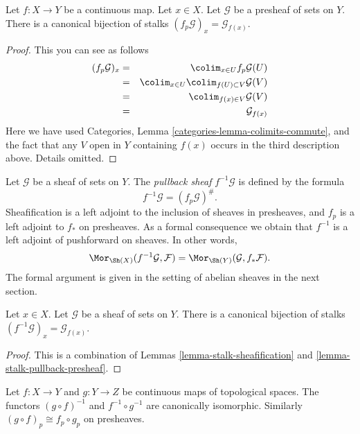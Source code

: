 \begin{lemma}
\label{lemma-stalk-pullback-presheaf}
Let $f : X \to Y$ be a continuous map.
Let $x \in X$. Let $\mathcal{G}$ be a presheaf of sets on $Y$.
There is a canonical bijection of stalks
$(f_p\mathcal{G})_x = \mathcal{G}_{f(x)}$.
\end{lemma}

\begin{proof}
This you can see as follows
\begin{eqnarray*}
(f_p\mathcal{G})_x
& = &
\colim_{x \in U} f_p\mathcal{G}(U) \\
& = &
\colim_{x \in U} \colim_{f(U) \subset V} \mathcal{G}(V) \\
& = &
\colim_{f(x) \in V} \mathcal{G}(V) \\
& = &
\mathcal{G}_{f(x)}
\end{eqnarray*}
Here we have used
Categories, Lemma \ref{categories-lemma-colimits-commute},
and the fact that any $V$ open in $Y$ containing $f(x)$
occurs in the third description above. Details omitted.
\end{proof}

\noindent
Let $\mathcal{G}$ be a sheaf of sets on $Y$.
The {\it pullback sheaf} $f^{-1}\mathcal{G}$ is defined
by the formula
$$
f^{-1}\mathcal{G} = (f_p\mathcal{G})^\# .
$$
Sheafification is a left adjoint to the inclusion
of sheaves in presheaves, and $f_p$ is a left
adjoint to $f_*$ on presheaves. As a formal consequence
we obtain that $f^{-1}$ is a left adjoint of
pushforward on sheaves. In other words,
$$
\Mor_{\Sh(X)}(f^{-1}\mathcal{G}, \mathcal{F})
=
\Mor_{\Sh(Y)}(\mathcal{G}, f_*\mathcal{F}).
$$
The formal argument is given in the setting of abelian
sheaves in the next section.

\begin{lemma}
\label{lemma-stalk-pullback}
Let $x \in X$. Let $\mathcal{G}$ be a sheaf of sets on $Y$.
There is a canonical bijection of stalks
$(f^{-1}\mathcal{G})_x = \mathcal{G}_{f(x)}$.
\end{lemma}

\begin{proof}
This is a combination of Lemmas \ref{lemma-stalk-sheafification}
and \ref{lemma-stalk-pullback-presheaf}.
\end{proof}

\begin{lemma}
\label{lemma-pullback-composition}
Let $f : X \to Y$ and $g : Y \to Z$ be continuous maps
of topological spaces. The functors $(g \circ f)^{-1}$
and $f^{-1} \circ g^{-1}$ are canonically isomorphic.
Similarly $(g \circ f)_p \cong f_p \circ g_p$ on
presheaves.
\end{lemma}

